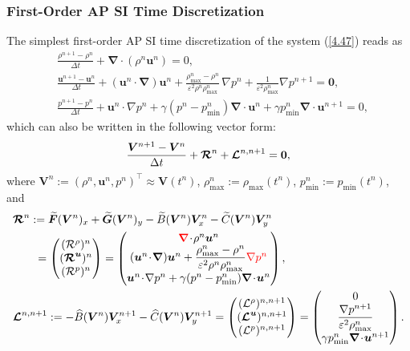\documentclass[A4paper,12pt,twoside]{article}
\numberwithin{equation}{section}
\numberwithin{figure}{section}
\numberwithin{table}{section}
\def\bnabla{\bm{\nabla}}
\newcommand{\dt}{\Delta t}
\newcommand{\mF}{\bm{F}}
\newcommand{\mG}{\bm{G}}
\newcommand{\ve}{\varepsilon}
\newcommand\eref[1]{(\ref{#1})}
\newcommand{\lore}[1]{{\leavevmode\color{red} #1}}
\begin{document}
\subsubsection{First-Order AP SI Time Discretization}
The simplest first-order AP SI time discretization of the system \eref{4.47} reads as
\begin{equation}
\begin{aligned}
&\frac{\rho^{n+1}-\rho^n}{\dt}+\bnabla\!\cdot\!(\rho^n\bm u^n)=0,\\
&\frac{\bm u^{n+1}-\bm u^n}{\dt}+(\bm u^n\!\cdot\!\bnabla)\bm u^n+\frac{\rho_{\max}^n-\rho^n}{\ve^2\rho^n\rho_{\max}^n}\,\nabla p^n+
\frac{1}{\ve^2\rho_{\max}^n}\nabla p^{n+1}=\bm0,\\
&\frac{p^{n+1}-p^n}{\dt}+\bm u^n\!\cdot\!\nabla p^n+\gamma(p^n-p_{\min}^n)\bnabla\!\cdot\!\bm u^n+\gamma p_{\min}^n
\bnabla\!\cdot\!\bm u^{n+1}=0,
\end{aligned}
\label{4.8}
\end{equation}
which can also be written in the following vector form:
\begin{equation*}
\frac{\bm V^{n+1}-\bm V^n}{\dt}+\bm{{\cal R}}^n+\bm{{\cal L}}^{n,n+1}=\bm0,
\end{equation*}
where $\bm V^n:=(\rho^n,\bm u^n,p^n)^\top\approx\bm V(t^n)$, $\rho_{\max}^n:=\rho_{\max}(t^n)$, $p_{\min}^n:=p_{\min}(t^n)$, and 
\begin{align}
&\begin{aligned}
\bm{{\cal R}}^n&:=\widetilde{\mF}(\bm V^n)_x+\widetilde{\mG}(\bm V^n)_y-\widetilde B(\bm V^n)\bm V_x^n-\widetilde C(\bm V^n)\bm V_y^n\\
&\hspace*{0.15cm}=\begin{pmatrix}({\cal R}^\rho)^n\\(\bm{{\cal R}}^{\bm u})^n\\({\cal R}^p)^n\end{pmatrix}=
\begin{pmatrix}\lore{\bnabla}\!\cdot\!\rho^n\bm u^n\\(\bm u^n\!\cdot\!\bnabla)\bm u^n+\dfrac{\rho_{\max}^n-\rho^n}{\ve^2\rho^n\rho_{\max}^n}\lore{\nabla p^n}\\[1.5ex]
\bm u^n\!\cdot\!\nabla p^n+\gamma(p^n-p_{\min}^n)\bnabla\!\cdot\!\bm u^n\end{pmatrix},
\end{aligned}\label{3.12f}\\
&\bm{{\cal L}}^{n,n+1}:=-\widehat B(\bm V^n)\bm V_x^{n+1}-\widehat C(\bm V^n)\bm V_y^{n+1}=
\begin{pmatrix}({\cal L}^\rho)^{n,n+1}\\(\bm{{\cal L}}^{\bm u})^{n,n+1}\\({\cal L}^p)^{n,n+1}\end{pmatrix}
=\begin{pmatrix}0\\\dfrac{\nabla p^{n+1}}{\ve^2\rho_{\max}^n}\\[1.5ex]
\gamma p_{\min}^n\bnabla\!\cdot\!\bm u^{n+1}\end{pmatrix}.\label{3.13f}
\end{align}
\end{document}
